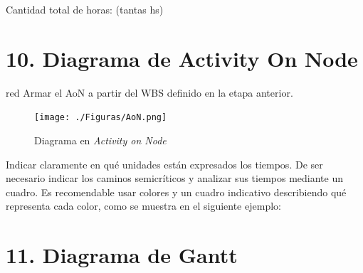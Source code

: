 \documentclass[
11pt, %
codirector, %
]{charter}
\begin{document}
Cantidad total de horas: (tantas hs)

\section{10. Diagrama de Activity On Node}
\label{sec:AoN}

\begin{consigna}{red}
Armar el AoN a partir del WBS definido en la etapa anterior. 



\end{consigna}

\begin{figure}[htpb]
\centering 
\texttt{[image: ./Figuras/AoN.png]}
\caption{Diagrama en \textit{Activity on Node}}
\label{fig:AoN}
\end{figure}

Indicar claramente en qué unidades están expresados los tiempos.
De ser necesario indicar los caminos semicríticos y analizar sus tiempos mediante un cuadro.
Es recomendable usar colores y un cuadro indicativo describiendo qué representa cada color, como se muestra en el siguiente ejemplo:



\section{11. Diagrama de Gantt}
\label{sec:gantt}
\end{document}
